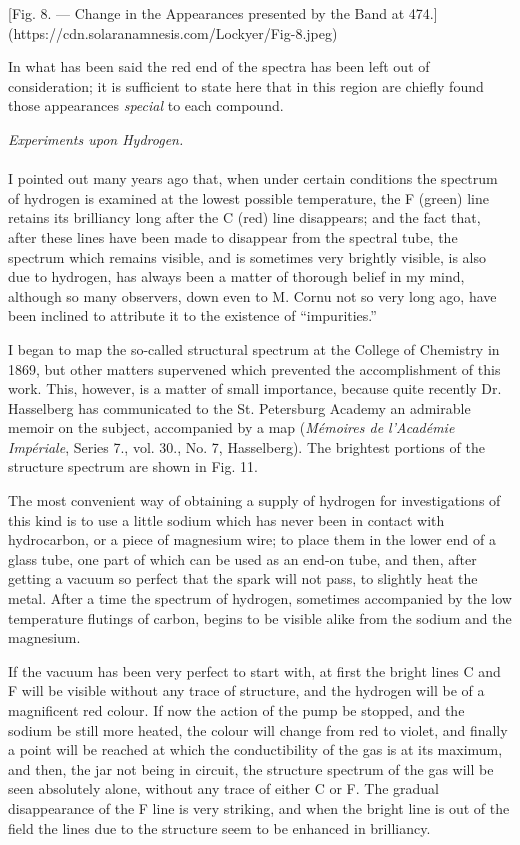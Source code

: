 \documentclass[a4paper, 12pt, oneside, polutonikogreek, english]{article}
\begin{document}
[Fig. 8. --- Change in the Appearances presented by the Band at 474.](https://cdn.solaranamnesis.com/Lockyer/Fig-8.jpeg)

In what has been said the red end of the spectra has been left out of consideration; it is sufficient to state here that in this region are chiefly found those appearances \emph{special} to each compound.
\begin{center}
\emph{Experiments upon Hydrogen.}
\end{center}
\paragraph{}
I pointed out many years ago that, when under certain conditions the spectrum of hydrogen is examined at the lowest possible temperature, the F (green) line retains its brilliancy long after the C (red) line disappears; and the fact that, after these lines have been made to disappear from the spectral tube, the spectrum which remains visible, and is sometimes very brightly visible, is also due to hydrogen, has always been a matter of thorough belief in my mind, although so many observers, down even to M. Cornu not so very long ago, have been inclined to attribute it to the existence of ``impurities.''

I began to map the so-called structural spectrum at the College of Chemistry in 1869, but other matters supervened which prevented the accomplishment of this work. This, however, is a matter of small importance, because quite recently Dr. Hasselberg has communicated to the St. Petersburg Academy an admirable memoir on the subject, accompanied by a map (\emph{Mémoires de l'Académie Impériale}, Series 7., vol. 30., No. 7, Hasselberg). The brightest portions of the structure spectrum are shown in Fig. 11.

The most convenient way of obtaining a supply of hydrogen for investigations of this kind is to use a little sodium which has never been in contact with hydrocarbon, or a piece of magnesium wire; to place them in the lower end of a glass tube, one part of which can be used as an end-on tube, and then, after getting a vacuum so perfect that the spark will not pass, to slightly heat the metal. After a time the spectrum of hydrogen, sometimes accompanied by the low temperature flutings of carbon, begins to be visible alike from the sodium and the magnesium.

If the vacuum has been very perfect to start with, at first the bright lines C and F will be visible without any trace of structure, and the hydrogen will be of a magnificent red colour. If now the action of the pump be stopped, and the sodium be still more heated, the colour will change from red to violet, and finally a point will be reached at which the conductibility of the gas is at its maximum, and then, the jar not being in circuit, the structure spectrum of the gas will be seen absolutely alone, without any trace of either C or F. The gradual disappearance of the F line is very striking, and when the bright line is out of the field the lines due to the structure seem to be enhanced in brilliancy.
\end{document}
